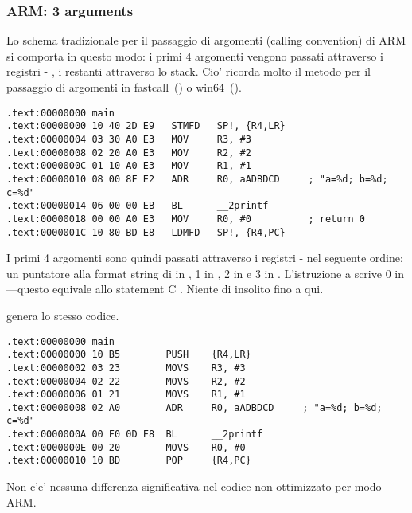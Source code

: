 \subsubsection{ARM: 3 arguments}

Lo schema tradizionale per il passaggio di argomenti (calling convention) di ARM si comporta in questo modo:
i primi 4 argomenti vengono passati attraverso i registri - , i restanti attraverso lo stack.
Cio' ricorda molto il metodo per il passaggio di argomenti in 
fastcall~() o win64~().


\mysubparagraph{\NonOptimizingKeilVI (\ARMMode)}

\begin{lstlisting}[caption=\NonOptimizingKeilVI (\ARMMode),style=customasmARM]
.text:00000000 main
.text:00000000 10 40 2D E9   STMFD   SP!, {R4,LR}
.text:00000004 03 30 A0 E3   MOV     R3, #3
.text:00000008 02 20 A0 E3   MOV     R2, #2
.text:0000000C 01 10 A0 E3   MOV     R1, #1
.text:00000010 08 00 8F E2   ADR     R0, aADBDCD     ; "a=%d; b=%d; c=%d"
.text:00000014 06 00 00 EB   BL      __2printf
.text:00000018 00 00 A0 E3   MOV     R0, #0          ; return 0
.text:0000001C 10 80 BD E8   LDMFD   SP!, {R4,PC}
\end{lstlisting}

I primi 4 argomenti sono quindi passati attraverso i registri - nel seguente ordine:
un puntatore alla format string di \printf in 
, 1 in , 2 in  e 3 in .
L'istruzione a  scrive 0 in ---questo equivale allo statement C .
Niente di insolito fino a qui.

\OptimizingKeilVI genera lo stesso codice.

\mysubparagraph{\OptimizingKeilVI (\ThumbMode)}

\begin{lstlisting}[caption=\OptimizingKeilVI (\ThumbMode),style=customasmARM]
.text:00000000 main
.text:00000000 10 B5        PUSH    {R4,LR}
.text:00000002 03 23        MOVS    R3, #3
.text:00000004 02 22        MOVS    R2, #2
.text:00000006 01 21        MOVS    R1, #1
.text:00000008 02 A0        ADR     R0, aADBDCD     ; "a=%d; b=%d; c=%d"
.text:0000000A 00 F0 0D F8  BL      __2printf
.text:0000000E 00 20        MOVS    R0, #0
.text:00000010 10 BD        POP     {R4,PC}
\end{lstlisting}

Non c'e' nessuna differenza significativa nel codice non ottimizzato per modo ARM.

